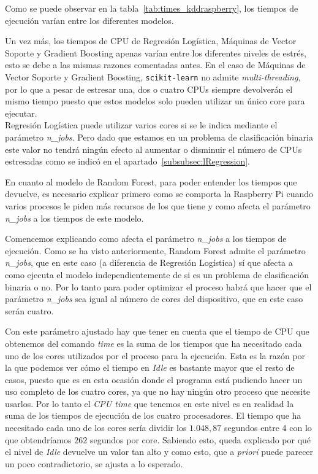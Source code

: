 \documentclass[a4paper, 12pt]{book}
\begin{document}
Como se puede observar en la tabla~\ref{tab:times_kddraspberry}, los tiempos de ejecución varían entre los diferentes modelos.

Un vez más, los tiempos de CPU de Regresión Logística, Máquinas de Vector Soporte y Gradient Boosting apenas varían entre los diferentes niveles de estrés, esto se debe a las mismas razones comentadas antes. En el caso de Máquinas de Vector Soporte y Gradient Boosting, \texttt{scikit-learn} no admite \textit{multi-threading}, por lo que a pesar de estresar una, dos o cuatro CPUs siempre devolverán el mismo tiempo puesto que estos modelos solo pueden utilizar un único core para ejecutar.\\
Regresión Logística puede utilizar varios cores si se le indica mediante el parámetro \textit{n\_jobs}. Pero dado que estamos en un problema de clasificación binaria este valor no tendrá ningún efecto al aumentar o disminuir el número de CPUs estresadas como se indicó en el apartado~\ref{subsubsec:lRegression}. 

En cuanto al modelo de Random Forest, para poder entender los tiempos que devuelve, es necesario explicar primero como se comporta la Raspberry Pi cuando varios procesos le piden más recursos de los que tiene y como afecta el parámetro \textit{n\_jobs} a los tiempos de este modelo.

Comencemos explicando como afecta el parámetro \textit{n\_jobs} a los tiempos de ejecución. Como se ha visto anteriormente, Random Forest admite el parámetro \textit{n\_jobs}, que en este caso (a diferencia de Regresión Logística) sí que afecta a como ejecuta el modelo independientemente de si es un problema de clasificación binaria o no. Por lo tanto para poder optimizar el proceso habrá que hacer que el parámetro \textit{n\_jobs} sea igual al número de cores del dispositivo, que en este caso serán cuatro. 

Con este parámetro ajustado hay que tener en cuenta que el tiempo de CPU que obtenemos del comando \textit{time} es la suma de los tiempos que ha necesitado cada uno de los cores utilizados por el proceso para la ejecución. Esta es la razón por la que podemos ver cómo el tiempo en \textit{Idle} es bastante mayor que el resto de casos, puesto que es en esta ocasión donde el programa está pudiendo hacer un uso completo de los cuatro cores, ya que no hay ningún otro proceso que necesite usarlos. Por lo tanto el \textit{CPU time} que tenemos en este nivel es en realidad la suma de los tiempos de ejecución de los cuatro procesadores. El tiempo que ha necesitado cada uno de los cores sería dividir los $1.048,87$ segundos entre 4 con lo que obtendríamos $262$ segundos por core. Sabiendo esto, queda explicado por qué el nivel de \textit{Idle} devuelve un valor tan alto y como esto, que a \textit{priori} puede parecer un poco contradictorio, se ajusta a lo esperado.
\end{document}
